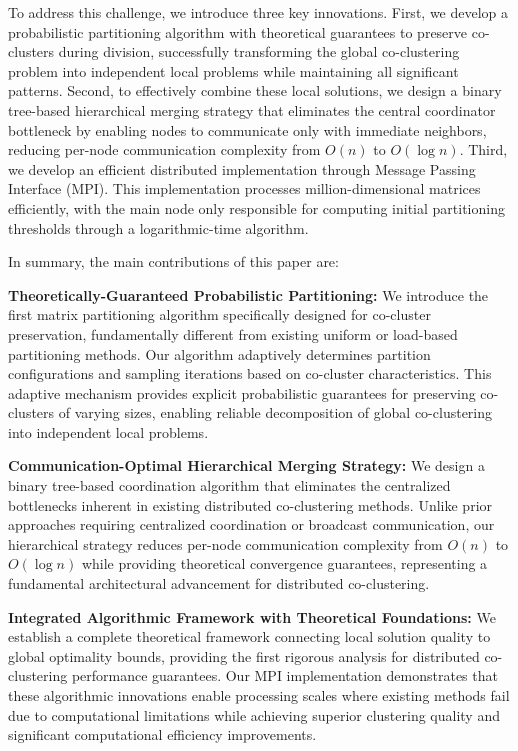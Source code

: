 \documentclass[journal]{IEEEtran}
\theoremstyle{definition}
\theoremstyle{remark} %
\begin{document}
To address this challenge, we introduce three key innovations. First, we develop a probabilistic partitioning algorithm with theoretical guarantees to preserve co-clusters during division, successfully transforming the global co-clustering problem into independent local problems while maintaining all significant patterns. Second, to effectively combine these local solutions, we design a binary tree-based hierarchical merging strategy that eliminates the central coordinator bottleneck by enabling nodes to communicate only with immediate neighbors, reducing per-node communication complexity from $O(n)$ to $O(\log n)$. Third, we develop an efficient distributed implementation through Message Passing Interface (MPI). This implementation processes million-dimensional matrices efficiently, with the main node only responsible for computing initial partitioning thresholds through a logarithmic-time algorithm.

In summary, the main contributions of this paper are:
\begin{enumerate}
    {\color{blue}
    \item \textbf{Theoretically-Guaranteed Probabilistic Partitioning:} We introduce the first matrix partitioning algorithm specifically designed for co-cluster preservation, fundamentally different from existing uniform or load-based partitioning methods. Our algorithm adaptively determines partition configurations and sampling iterations based on co-cluster characteristics. This adaptive mechanism provides explicit probabilistic guarantees for preserving co-clusters of varying sizes, enabling reliable decomposition of global co-clustering into independent local problems.
          }

    \item \textbf{Communication-Optimal Hierarchical Merging Strategy:} We design a binary tree-based coordination algorithm that eliminates the centralized bottlenecks inherent in existing distributed co-clustering methods. Unlike prior approaches requiring centralized coordination or broadcast communication, our hierarchical strategy reduces per-node communication complexity from $O(n)$ to $O(\log n)$ while providing theoretical convergence guarantees, representing a fundamental architectural advancement for distributed co-clustering.

    \item \textbf{Integrated Algorithmic Framework with Theoretical Foundations:} We establish a complete theoretical framework connecting local solution quality to global optimality bounds, providing the first rigorous analysis for distributed co-clustering performance guarantees. Our MPI implementation demonstrates that these algorithmic innovations enable processing scales where existing methods fail due to computational limitations while achieving superior clustering quality and significant computational efficiency improvements.
\end{enumerate}
\end{document}
